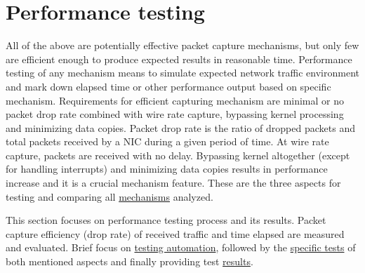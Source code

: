 \documentclass[12pt,a4paper,twoside]{report}
\begin{document}
	\section{Performance testing} \label{analysis:testing}
		All of the above are potentially effective packet capture mechanisms, but only few are efficient enough to produce expected results in reasonable time. Performance testing of any mechanism means to simulate expected network traffic environment and mark down elapsed time or other performance output based on specific mechanism. Requirements for efficient capturing mechanism are minimal or no packet drop rate combined with wire rate capture, bypassing kernel processing and minimizing data copies. Packet drop rate is the ratio of dropped packets and total packets received by a NIC during a given period of time. At wire rate capture, packets are received with no delay. Bypassing kernel altogether (except for handling interrupts) and minimizing data copies results in performance increase and it is a crucial mechanism feature. These are the three aspects for testing and comparing all \hyperref[analysis:mechs]{mechanisms} analyzed.\par
		This section focuses on performance testing process and its results. Packet capture efficiency (drop rate) of received traffic and time elapsed are measured and evaluated. Brief focus on \hyperref[analysis:testing:auto]{testing automation}, followed by the \hyperref[analysis:testing:tests]{specific tests} of both mentioned aspects and finally providing test \hyperref[analysis:testing:results]{results}.
\end{document}
